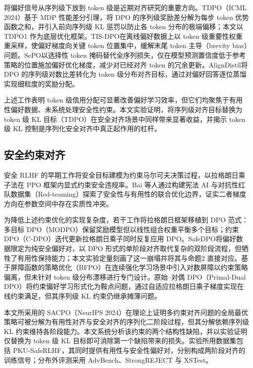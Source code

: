 \documentclass[lettersize,journal]{IEEEtran}
\begin{document}
将偏好信号从序列级下放到 token 级是近期对齐研究的重要方向。TDPO\cite{zeng2024token}（ICML 2024）基于 MDP 性能差分引理，将 DPO 的序列级奖励差分解为每步 token 优势函数之和，并引入前向序列级 KL 惩罚以防止各 token 分布的极端偏移；本文以 TDPO1 作为底层优化框架。TIS-DPO\cite{wang2023tisdpo}在离线偏好数据上以 token 级重要性权重重采样，使偏好梯度向关键 token 位置集中，缓解末尾 token 主导（brevity bias）问题。SePO\cite{chen2024sepo}以选择性 token 掩码替代全序列损失，仅在模型预测置信度低于参考策略的位置施加偏好优化梯度，减少对已经对齐 token 的冗余更新。AlignDistil\cite{liu2024aligndistil}将 DPO 的序列级对数比差转化为 token 级分布对齐目标，通过对偏好回答逐位蒸馏实现细粒度的奖励分配。

上述工作表明 token 级信用分配可显著改善偏好学习效率，但它们均聚焦于有用性偏好数据、未系统处理安全性约束。本文实验证明，将序列级对齐目标替换为 token 级 KL 目标（TDPO）在安全对齐场景中同样带来显著收益，并揭示 token 级 KL 控制是序列化安全对齐中真正起作用的杠杆。

\subsection{安全约束对齐}

安全 RLHF 的早期工作将安全目标建模为约束马尔可夫决策过程，以拉格朗日乘子法在 PPO 框架内显式约束安全违规率\cite{dai2023safe}。Bai 等人\cite{bai2022training}通过构建宪法 AI 与对抗性红队数据集（Red-teaming\cite{ganguli2022red}）探索了安全性与有用性的联合优化边界，证实二者梯度方向在参数空间中存在实质性冲突。

为降低上述约束优化的实现复杂度，若干工作将拉格朗日框架移植到 DPO 范式：多目标 DPO（MODPO）\cite{zhou2024beyond}保留奖励模型但以线性组合权重平衡多个目标；约束 DPO（C-DPO）\cite{liu2024enhancing}迭代更新拉格朗日乘子同时反复应用 DPO。SafeDPO\cite{kim2025safedpo}将偏好数据限定为纯安全偏好对，以 DPO 形式的单阶段对齐取代复杂的双阶段流程，但牺牲了有用性保持能力；本文实验定量刻画了这一崩塌并将其与命题2 直接对应。基于屏障函数的策略优化（BFPO）\cite{zhang2025bfpo}在连续强化学习场景中引入对数屏障以约束策略偏离，但未针对 token 级分布漂移进行专门设计。原始–对偶 DPO（Primal-Dual DPO）\cite{zhao2024primaldual}将约束偏好学习形式化为鞍点问题，通过自适应拉格朗日乘子梯度实现在线约束满足，但其序列级 KL 约束仍继承摊薄问题。

本文所采用的 SACPO\cite{wachi2024stepwise}（NeurIPS 2024）在理论上证明多约束对齐问题的全局最优策略可被分解为有用性对齐与安全对齐的序列化二阶段过程，但其分解依赖序列级 KL 约束维持各阶段能力。本文系统分析该约束的两个结构性缺陷，并以实验证明仅替换为 token 级 KL 目标即可消除第一个缺陷带来的损失。实验所用数据集包括 PKU-SafeRLHF\cite{ji2024beavertails}，其同时提供有用性与安全性偏好对，分别构成两阶段对齐的训练信号；分布外评测采用 AdvBench\cite{zou2023universal}、StrongREJECT\cite{souly2024strongreject} 与 XSTest\cite{rottger2024xstest}。
\end{document}
